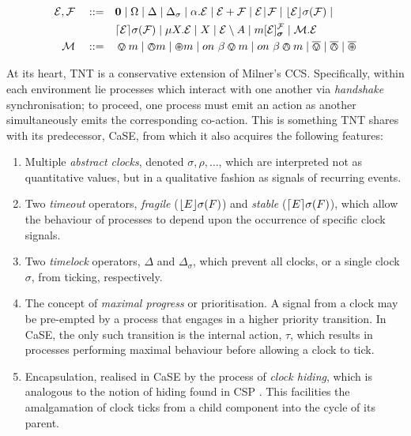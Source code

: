 \documentclass[orivec,envcountsame]{llncs}
\begin{document}
\begin{equation}
  \begin{aligned}
    \expr, \exprb \quad \mathrel{::=} \quad &
      \nil  \mid
      \Omega \mid
      \Delta \mid
      \Delta_{\sigma} \mid
      \alpha . \expr  \mid
      \expr + \exprb \mid
      \expr \mathrel{\!|\!} \exprb \mid
      \timeout{\expr}{\sigma}{\exprb} \mid \\
    & \stimeout{\expr}{\sigma}{\exprb} \mid 
      \mu X . \expr \mid
      X \mid 
      \expr \res{A} \mid
      \locv{m}{\expr}{\exprb}{\vec{\sigma}} \mid
      \ambop . \expr \\
   \ambop \quad \mathrel{::=} \quad & \tntin{m} \mid \tntout{m} \mid \tntopen{m} \mid
      \procin{\beta}{m} \mid \procout{\beta}{m} \mid \bin \mid
      \bout \mid \bopen
   \end{aligned}
   \label{eqn:tnt-syntax}
\end{equation}


At its heart, TNT is a conservative extension of Milner's CCS.
Specifically, within each environment lie processes which interact with
one another via \emph{handshake} synchronisation; to proceed, one
process must emit an action as another simultaneously emits the
corresponding co-action.  This is something TNT shares with its
predecessor, CaSE, from which it also acquires the following features:

\begin{enumerate}
\item Multiple \emph{abstract clocks}, denoted $\sigma, \rho, \dots$,
      which are interpreted not as quantitative values, but in a
      qualitative fashion as signals of recurring events.
\item Two \emph{timeout} operators, \emph{fragile} ($\lfloor{E}\rfloor {\sigma} ({F})$) and
      \emph{stable} ($\lceil{E}\rceil {\sigma} ({F})$), which allow the behaviour of
      processes to depend upon the occurrence of specific clock
      signals.
\item Two \emph{timelock} operators, $\Delta$ and $\Delta_{\sigma}$,
      which prevent all clocks, or a single
      clock $\sigma$, from ticking, respectively.
\item The concept of \emph{maximal progress} or
      prioritisation.  A signal from a clock may be pre-empted by a process that engages in a higher priority
      transition.  In CaSE, the only such transition is the internal action,
      $\tau$, which results in processes performing maximal
      behaviour before allowing a clock to tick.
\item Encapsulation, realised in CaSE by the process of \emph{clock
      hiding}, which is analogous to the notion of hiding found in
      CSP \cite{hoare:csp78}.  This facilities the amalgamation of clock ticks
      from a child component into the cycle of its parent.
\end{enumerate}
\end{document}
